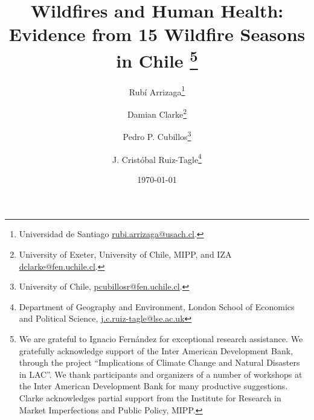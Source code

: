 \documentclass[11pt]{article}
\begin{document}
\title{\textbf{Wildfires and Human Health: Evidence from 15 Wildfire Seasons in Chile}
\thanks{We are grateful to Ignacio Fernández for exceptional research assistance. %
We gratefully acknowledge support of the Inter American Development Bank, through the project ``Implications of Climate Change and Natural Disasters in LAC''. We thank participants and organizers of a number of workshops at the Inter American Development Bank for many productive suggestions. Clarke acknowledges partial support from the Institute for Research in Market Imperfections and Public Policy, MIPP.}} %
\author{Rub\'i Arrizaga\thanks{Universidad de Santiago \href{mailto: rubi.arrizaga@usach.cl}{rubi.arrizaga@usach.cl}.}
  \and Damian Clarke\thanks{University of Exeter, University of Chile, MIPP, and IZA \href{mailto:dclarke@fen.uchile.cl}{dclarke@fen.uchile.cl}.}
    \and Pedro P. Cubillos\thanks{University of Chile, \href{mailto:pcubillosr@fen.uchile.cl}{pcubillosr@fen.uchile.cl}.}
\and J. Crist\'obal Ruiz-Tagle\thanks{Department of Geography and Environment, London School of Economics and Political Science, \href{mailto:j.c.ruiz-tagle@lse.ac.uk}{j.c.ruiz-tagle@lse.ac.uk}}}
\date{\today}

\renewcommand{\thefootnote}{\arabic{footnote}}
\setcounter{footnote}{0} 
\thispagestyle{empty}
\maketitle
\end{document}
